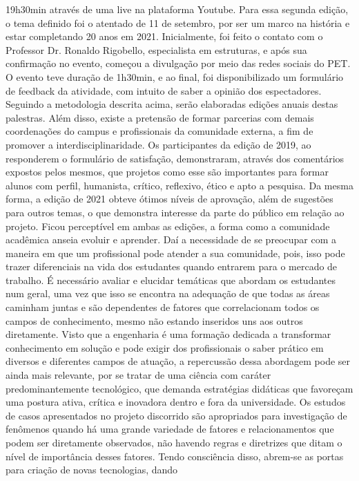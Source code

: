 19h30min através de uma live na plataforma Youtube. Para essa segunda edição, o tema definido 
foi o atentado de 11 de setembro, por ser um marco na história e estar completando 20 anos em 
2021. Inicialmente, foi feito o contato com o Professor Dr. Ronaldo Rigobello, especialista em 
estruturas, e após sua confirmação no evento, começou a divulgação por meio das redes sociais do 
PET. O evento teve duração de 1h30min, e ao final, foi disponibilizado um formulário de feedback 
da atividade, com intuito de saber a opinião dos espectadores.
Seguindo a metodologia descrita acima, serão elaboradas edições anuais destas palestras. 
Além disso, existe a pretensão de formar parcerias com demais coordenações do campus e 
profissionais da comunidade externa, a fim de promover a interdisciplinaridade.
Os participantes da edição de 2019, ao responderem o formulário de satisfação, 
demonstraram, através dos comentários expostos pelos mesmos, que projetos como esse são 
importantes para formar alunos com perfil, humanista, crítico, reflexivo, ético e apto a pesquisa. 
Da mesma forma, a edição de 2021 obteve ótimos níveis de aprovação, além de sugestões para 
outros temas, o que demonstra interesse da parte do público em relação ao projeto. Ficou
perceptível em ambas as edições, a forma como a comunidade acadêmica anseia evoluir e 
aprender. Daí a necessidade de se preocupar com a maneira em que um profissional pode atender 
a sua comunidade, pois, isso pode trazer diferenciais na vida dos estudantes quando entrarem para 
o mercado de trabalho.
É necessário avaliar e elucidar temáticas que abordam os estudantes num geral, uma vez 
que isso se encontra na adequação de que todas as áreas caminham juntas e são dependentes de 
fatores que correlacionam todos os campos de conhecimento, mesmo não estando inseridos uns 
aos outros diretamente. Visto que a engenharia é uma formação dedicada a transformar
conhecimento em solução e pode exigir dos profissionais o saber prático em diversos e diferentes 
campos de atuação, a repercussão dessa abordagem pode ser ainda mais relevante, por se tratar de 
uma ciência com caráter predominantemente tecnológico, que demanda estratégias didáticas que 
favoreçam uma postura ativa, crítica e inovadora dentro e fora da universidade.
Os estudos de casos apresentados no projeto discorrido são apropriados para investigação 
de fenômenos quando há uma grande variedade de fatores e relacionamentos que podem ser 
diretamente observados, não havendo regras e diretrizes que ditam o nível de importância desses 
fatores. Tendo consciência disso, abrem-se as portas para criação de novas tecnologias, dando 
